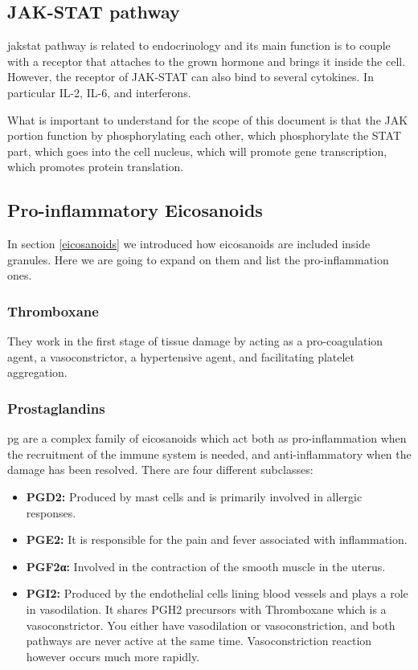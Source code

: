 \subsection{JAK-STAT pathway}
\label{in:JAKSTAT}

\gls{jakstat} pathway is related to endocrinology and its main function is to couple with a receptor that attaches to the grown hormone and brings it inside the cell. However, the receptor of JAK-STAT can also bind to several cytokines. In particular IL-2, IL-6, and interferons.

What is important to understand for the scope of this document is that the JAK portion function by phosphorylating each other, which phosphorylate the STAT part, which goes into the cell nucleus, which will promote gene transcription, which promotes protein translation.

\subsection{Pro-inflammatory Eicosanoids}
\label{arcachonidacidsPRO}

In section \ref{eicosanoids} we introduced how eicosanoids are included inside granules. Here we are going to expand on them and list the pro-inflammation ones.

\subsubsection{Thromboxane}
\label{in:Thromboxane}

They work in the first stage of tissue damage by acting as a pro-coagulation agent, a vasoconstrictor, a hypertensive agent, and facilitating platelet aggregation.

\subsubsection{Prostaglandins}

\gls{pg} are a complex family of eicosanoids which act both as pro-inflammation when the recruitment of the immune system is needed, and anti-inflammatory when the damage has been resolved. There are four different subclasses:

    \begin{itemize}
        \item {\textbf{PGD2:}} Produced by mast cells and is primarily involved in allergic responses.
        \item {\textbf{PGE2:}} It is responsible for the pain and fever associated with inflammation.
        \item {\textbf{PGF2α:}} Involved in the contraction of the smooth muscle in the uterus.
        \item {\textbf{PGI2:}} Produced by the endothelial cells lining blood vessels and plays a role in vasodilation. It shares PGH2 precursors with Thromboxane which is a vasoconstrictor. You either have vasodilation or vasoconstriction, and both pathways are never active at the same time. Vasoconstriction reaction however occurs much more rapidly.
    \end{itemize}

